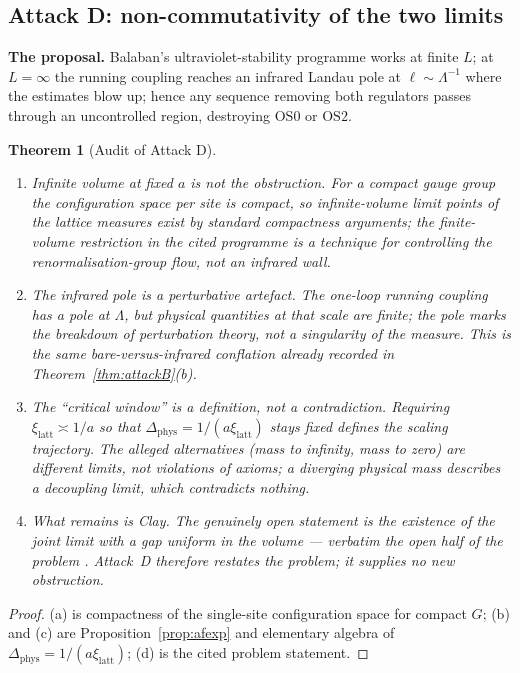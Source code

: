 \documentclass[11pt,a4paper]{article}
\theoremstyle{plain}
\newtheorem{theorem}{Theorem}[section]
\theoremstyle{definition}
\theoremstyle{remark}
\newcommand{\OS}{\mathrm{OS}}\newcommand{\Gap}{\mathrm{Gap}}
\renewcommand{\_}{\oldunderscore\allowbreak}
\begin{document}
\subsection{Attack D: non-commutativity of the two limits}
\textbf{The proposal.} Balaban's ultraviolet-stability programme works at finite $L$; at
$L=\infty$ the running coupling reaches an infrared Landau pole at $\ell\sim\Lambda^{-1}$ where
the estimates blow up; hence any sequence removing both regulators passes through an
uncontrolled region, destroying $\OS0$ or $\OS2$.
\begin{theorem}[Audit of Attack D]\label{thm:attackD}
\begin{enumerate}[label=(\alph*),leftmargin=22pt,itemsep=2pt]
\item \emph{Infinite volume at fixed $a$ is not the obstruction.} For a compact gauge group the
configuration space per site is compact, so infinite-volume limit points of the lattice measures
exist by standard compactness arguments; the finite-volume restriction in the cited programme is
a technique for controlling the renormalisation-group flow, not an infrared wall.
\item \emph{The infrared pole is a perturbative artefact.} The one-loop running coupling has a
pole at $\Lambda$, but physical quantities at that scale are finite; the pole marks the breakdown
of perturbation theory, not a singularity of the measure. This is the same bare-versus-infrared
conflation already recorded in Theorem~\ref{thm:attackB}(b).
\item \emph{The ``critical window'' is a definition, not a contradiction.} Requiring
$\xi_{\mathrm{latt}}\asymp1/a$ so that $\Delta_{\mathrm{phys}}=1/(a\xi_{\mathrm{latt}})$ stays
fixed \emph{defines} the scaling trajectory. The alleged alternatives (mass to infinity, mass to
zero) are different limits, not violations of axioms; a diverging physical mass describes a
decoupling limit, which contradicts nothing.
\item \emph{What remains is Clay.} The genuinely open statement is the existence of the joint
limit with a gap \emph{uniform in the volume} --- verbatim the open half of the problem
\cite{JaffeWitten2000}. Attack~D therefore restates the problem; it supplies no new obstruction.
\end{enumerate}
\end{theorem}
\begin{proof}
(a) is compactness of the single-site configuration space for compact $G$; (b) and (c) are
Proposition~\ref{prop:afexp} and elementary algebra of
$\Delta_{\mathrm{phys}}=1/(a\xi_{\mathrm{latt}})$; (d) is the cited problem statement.
\end{proof}
\end{document}
